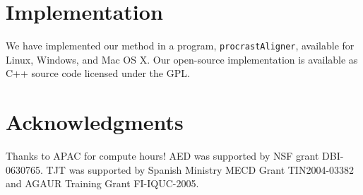 \documentclass{ws-procs975x65}
\begin{document}
\section{Implementation}
We have implemented our method in a program, \texttt{procrastAligner}, available for Linux, Windows, and Mac OS X. Our open-source implementation is available as C++ source code licensed under the GPL.

\section{ Acknowledgments }
Thanks to APAC for compute hours! AED was supported by NSF grant DBI-0630765. TJT was
supported by Spanish Ministry MECD Grant TIN2004-03382 and AGAUR
Training Grant FI-IQUC-2005. 




\end{document}
